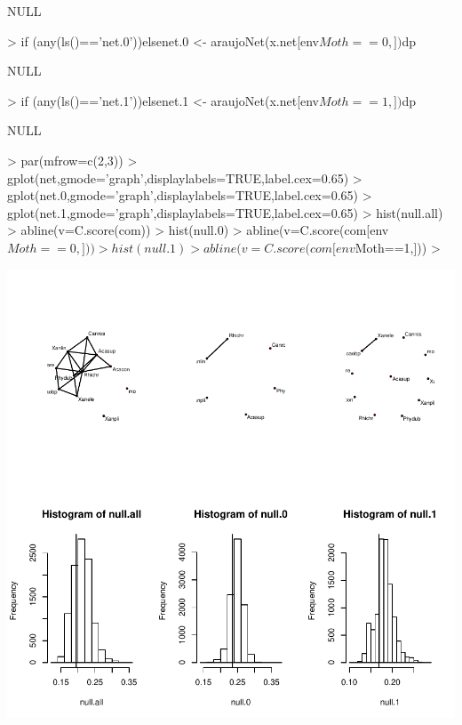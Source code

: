 \documentclass[12pt]{article}
\begin{document}
\begin{Schunk}
\begin{Soutput}
NULL
\end{Soutput}
\begin{Sinput}
> if (any(ls()=='net.0')){}else{net.0 <- araujoNet(x.net[env$Moth==0,])$dp}
\end{Sinput}
\begin{Soutput}
NULL
\end{Soutput}
\begin{Sinput}
> if (any(ls()=='net.1')){}else{net.1 <- araujoNet(x.net[env$Moth==1,])$dp}
\end{Sinput}
\begin{Soutput}
NULL
\end{Soutput}
\begin{Sinput}
> par(mfrow=c(2,3))
> gplot(net,gmode='graph',displaylabels=TRUE,label.cex=0.65)
> gplot(net.0,gmode='graph',displaylabels=TRUE,label.cex=0.65)
> gplot(net.1,gmode='graph',displaylabels=TRUE,label.cex=0.65)
> hist(null.all)
> abline(v=C.score(com))
> hist(null.0)
> abline(v=C.score(com[env$Moth==0,]))
> hist(null.1)
> abline(v=C.score(com[env$Moth==1,]))
> 
\end{Sinput}
\end{Schunk}
\includegraphics{SCRL-026}
\end{document}

